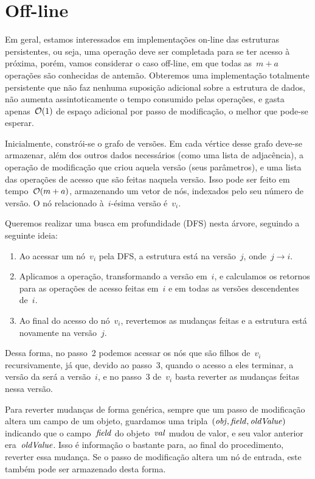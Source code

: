 \documentclass[../../main.tex]{subfiles}
\begin{document}
\section{Off-line}

Em geral, estamos interessados em implementações on-line das estruturas persistentes, ou seja, uma operação deve ser completada para se ter acesso à próxima, porém, vamos considerar o caso off-line, em que todas as~$m+a$ operações são conhecidas de antemão. Obteremos uma implementação totalmente persistente que não faz nenhuma suposição adicional sobre a estrutura de dados, não aumenta assintoticamente o tempo consumido pelas operações, e gasta apenas~$\mathcal{O}(1)$ de espaço adicional por passo de modificação, o melhor que pode-se esperar.

Inicialmente, constrói-se o grafo de versões. Em cada vértice desse grafo deve-se armazenar, além dos outros dados necessários (como uma lista de adjacência), a operação de modificação que criou aquela versão (seus parâmetros), e uma lista das operações de acesso que são feitas naquela versão. Isso pode ser feito em tempo~$\mathcal{O}(m+a)$, armazenando um vetor de nós, indexados pelo seu número de versão. O nó relacionado à~$i$-ésima versão é~$v_i$.

Queremos realizar uma busca em profundidade (DFS) nesta árvore, seguindo a seguinte ideia:
\begin{enumerate}
	\item Ao acessar um nó~$v_i$ pela DFS, a estrutura está na versão~$j$, onde~$j \rightarrow i$.
	\item Aplicamos a operação, transformando a versão em~$i$, e calculamos os retornos para as operações de acesso feitas em~$i$ e em todas as versões descendentes de~$i$.
	\item Ao final do acesso do nó~$v_i$, revertemos as mudanças feitas e a estrutura está novamente na versão~$j$.
\end{enumerate}

Dessa forma, no passo~2 podemos acessar os nós que são filhos de~$v_i$ recursivamente, já que, devido ao passo~3, quando o acesso a eles terminar, a versão da será a versão~$i$, e no passo~3 de~$v_i$ basta reverter as mudanças feitas nessa versão.

Para reverter mudanças de forma genérica, sempre que um passo de modificação altera um campo de um objeto, guardamos uma tripla~$(\mathit{obj}, \mathit{field}, \mathit{oldValue})$ indicando que o campo~$\mathit{field}$ do objeto~$\mathit{val}$ mudou de valor, e seu valor anterior era~$\mathit{oldValue}$. Isso é informação o bastante para, ao final do procedimento, reverter essa mudança. Se o passo de modificação altera um nó de entrada, este também pode ser armazenado desta forma.
\end{document}
